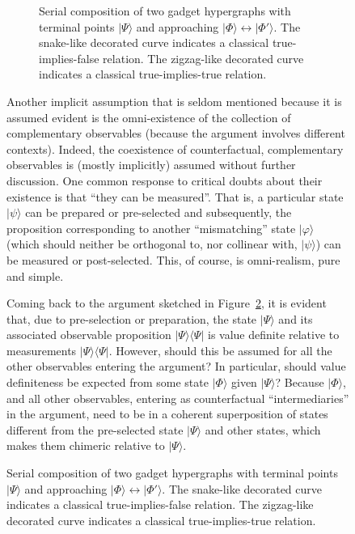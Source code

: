 \documentclass[entropy,article,accept,oneauthor,pdftex]{Definitions/mdpi}
\begin{document}
\begin{figure}[H]
\begin{figure}
\begin{center}
        \end{center}
\fi
        \caption{\label{2021-rto-Baba-Taher}
                Serial composition of two gadget hypergraphs with terminal points $\vert \Psi \rangle$ and approaching
$\vert \Phi  \rangle \leftrightarrow \vert \Phi' \rangle$.
                The snake-like decorated curve indicates a classical true-implies-false relation.
                The zigzag-like decorated curve indicates a classical true-implies-true relation.
        }
\end{figure}



Another implicit assumption that is seldom mentioned because it is assumed evident is the
omni-existence of the collection of complementary observables
(because the argument involves different contexts).
Indeed, the coexistence of counterfactual, complementary observables is (mostly implicitly) assumed without further discussion.
One common response to critical doubts about their existence is that ``they can be measured''.
That is, a particular state $\vert \psi \rangle$ can be prepared or pre-selected
and subsequently, the proposition corresponding to another ``mismatching'' state  $\vert \varphi \rangle$
(which should neither be orthogonal to, nor collinear with, $\vert \psi \rangle$)
can be measured or post-selected.
This, of course, is omni-realism, pure and simple.

Coming back to the argument sketched in Figure~\ref{2021-rto-Baba-Taher}, it is evident that, due to pre-selection or preparation, the state $\vert \Psi \rangle$
and its associated observable proposition $\vert \Psi \rangle \langle \Psi \vert$ is value definite relative to measurements $\vert \Psi \rangle \langle \Psi \vert$.
However, should this be assumed for all the other observables entering the argument?
In particular, should value definiteness be expected from some state $\vert \Phi \rangle$ given $\vert \Psi \rangle$?
Because $\vert \Phi \rangle$, and all other observables, entering as counterfactual ``intermediaries'' in the argument,
need to be in a coherent superposition of states different from the pre-selected state $\vert \Psi \rangle$ and other states,
which makes them chimeric
relative to $\vert \Psi \rangle$.




\end{figure}
\end{document}
